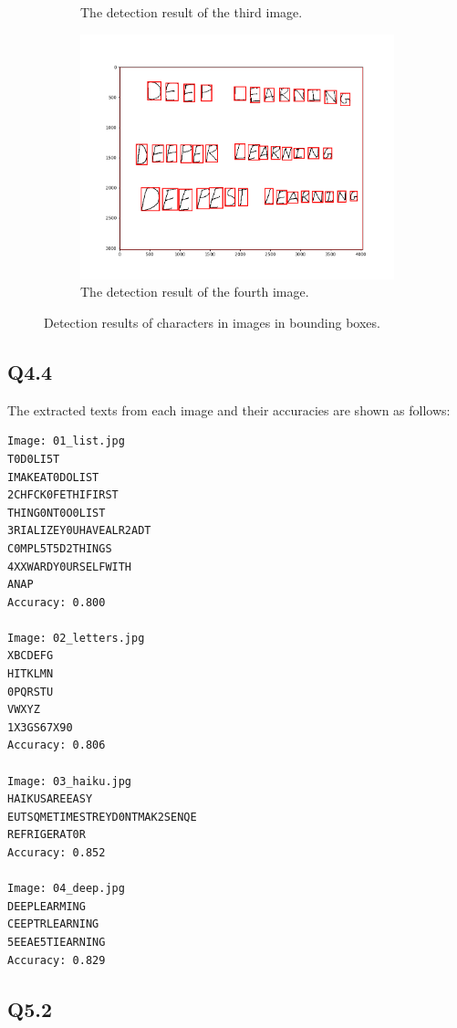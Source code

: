 \documentclass[11pt]{article}
\begin{document}
\begin{figure}[h!]
\begin{subfigure}{.495\textwidth}
      \caption{The detection result of the third image. }
    \end{subfigure}
    \begin{subfigure}{.495\textwidth}
      \centering
      \includegraphics[width=.9\linewidth]{../results/q4_3_4.png}
      \caption{The detection result of the fourth image. }
    \end{subfigure}\hfill
    \caption{Detection results of characters in images in bounding boxes. }
    \label{fig:q4.3}
\end{figure}

\newpage
\subsection*{Q4.4}

The extracted texts from each image and their accuracies are shown as follows:

\begin{verbatim}
Image: 01_list.jpg
T0D0LI5T
IMAKEAT0DOLIST
2CHFCK0FETHIFIRST
THING0NT0O0LIST
3RIALIZEY0UHAVEALR2ADT
C0MPL5T5D2THINGS
4XXWARDY0URSELFWITH
ANAP
Accuracy: 0.800

Image: 02_letters.jpg
XBCDEFG
HITKLMN
0PQRSTU
VWXYZ
1X3GS67X90
Accuracy: 0.806

Image: 03_haiku.jpg
HAIKUSAREEASY
EUTSQMETIMESTREYD0NTMAK2SENQE
REFRIGERAT0R
Accuracy: 0.852

Image: 04_deep.jpg
DEEPLEARMING
CEEPTRLEARNING
5EEAE5TIEARNING
Accuracy: 0.829
\end{verbatim}

\newpage

\subsection*{Q5.2}
\end{document}
